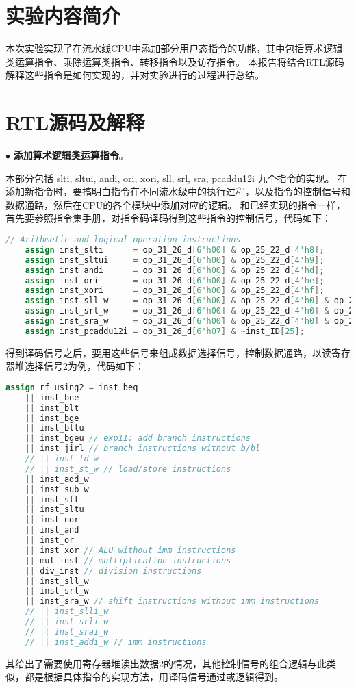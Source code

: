 \documentclass[11pt]{article}
\begin{document}


\section{实验内容简介}

本次实验实现了在流水线CPU中添加部分用户态指令的功能，其中包括算术逻辑类运算指令、乘除运算类指令、转移指令以及访存指令。
本报告将结合RTL源码解释这些指令是如何实现的，并对实验进行的过程进行总结。

\section{RTL源码及解释}
\vspace{1em}
\noindent
$\bullet$
\textbf{添加算术逻辑类运算指令}。

本部分包括 slti, sltui, andi, ori, xori, sll, srl, sra, pcaddu12i 九个指令的实现。
在添加新指令时，要搞明白指令在不同流水级中的执行过程，以及指令的控制信号和数据通路，然后在CPU的各个模块中添加对应的逻辑。
和已经实现的指令一样，首先要参照指令集手册，对指令码译码得到这些指令的控制信号，代码如下： 
\begin{lstlisting}[language=Verilog]
    // Arithmetic and logical operation instructions
    assign inst_slti      = op_31_26_d[6'h00] & op_25_22_d[4'h8];
    assign inst_sltui     = op_31_26_d[6'h00] & op_25_22_d[4'h9];
    assign inst_andi      = op_31_26_d[6'h00] & op_25_22_d[4'hd];
    assign inst_ori       = op_31_26_d[6'h00] & op_25_22_d[4'he];
    assign inst_xori      = op_31_26_d[6'h00] & op_25_22_d[4'hf];
    assign inst_sll_w     = op_31_26_d[6'h00] & op_25_22_d[4'h0] & op_21_20_d[2'h1] & op_19_15_d[5'h0e];
    assign inst_srl_w     = op_31_26_d[6'h00] & op_25_22_d[4'h0] & op_21_20_d[2'h1] & op_19_15_d[5'h0f];
    assign inst_sra_w     = op_31_26_d[6'h00] & op_25_22_d[4'h0] & op_21_20_d[2'h1] & op_19_15_d[5'h10];
    assign inst_pcaddu12i = op_31_26_d[6'h07] & ~inst_ID[25];
\end{lstlisting}

得到译码信号之后，要用这些信号来组成数据选择信号，控制数据通路，以读寄存器堆选择信号2为例，代码如下：
\begin{lstlisting}[language=Verilog]
    assign rf_using2 = inst_beq 
    || inst_bne 
    || inst_blt
    || inst_bge
    || inst_bltu
    || inst_bgeu // exp11: add branch instructions
    || inst_jirl // branch instructions without b/bl
    // || inst_ld_w 
    // || inst_st_w // load/store instructions
    || inst_add_w
    || inst_sub_w
    || inst_slt
    || inst_sltu
    || inst_nor
    || inst_and
    || inst_or
    || inst_xor // ALU without imm instructions
    || mul_inst // multiplication instructions
    || div_inst // division instructions
    || inst_sll_w
    || inst_srl_w
    || inst_sra_w // shift instructions without imm instructions
    // || inst_slli_w
    // || inst_srli_w
    // || inst_srai_w
    // || inst_addi_w // imm instructions
\end{lstlisting}
其给出了需要使用寄存器堆读出数据2的情况，其他控制信号的组合逻辑与此类似，都是根据具体指令的实现方法，用译码信号通过或逻辑得到。
\end{document}
